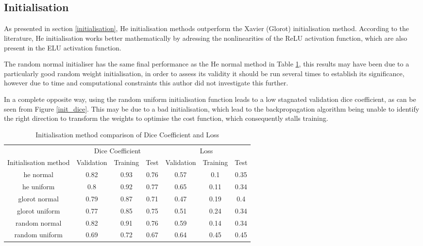 \subsection{Initialisation}
\paragraph{}
As presented in section \ref{initialisation}, He initialisation methods outperform the Xavier (Glorot) initialisation method. According to the literature, He initialisation works better mathematically by adressing the nonlinearities of the \gls{ReLU} activation function, which are also present in the \gls{ELU} activation function. 

The random normal initialiser has the same final performance as the He normal method in Table \ref{tab_init}, this results may have been due to a particularly good random weight initialisation, in order to assess its validity it should be run several times to establish its significance, however due to time and computational constraints this author did not investigate this further.

In a complete opposite way, using the random uniform initialisation function leads to a low stagnated validation dice coefficient, as can be seen from Figure \ref{init_dice}. This may be due to a bad initialisation, which lead to the backpropagation algorithm being unable to identify the right direction to transform the weights to optimise the cost function, which consequently stalls training.

\begin{table}[ht!] 
    \begin{center}
    \begin{tabular}{ccccccc} 
    \toprule
       & \multicolumn{3}{c}{Dice Coefficient}     & \multicolumn{3}{c}{Loss} \\
    Initialisation method & Validation & Training & Test & Validation    & Training    & Test   \\ \midrule
    \rowcolor{lightgray} he normal & 0.82 & 0.93 & 0.76 & 0.57 & 0.1 & 0.35  \\ he uniform & 0.8 & 0.92 & 0.77 & 0.65 & 0.11 & 0.34  \\ glorot normal & 0.79 & 0.87 & 0.71 & 0.47 & 0.19 & 0.4  \\ glorot uniform & 0.77 & 0.85 & 0.75 & 0.51 & 0.24 & 0.34  \\ random normal & 0.82 & 0.91 & 0.76 & 0.59 & 0.14 & 0.34  \\ random uniform & 0.69 & 0.72 & 0.67 & 0.64 & 0.45 & 0.45  \\
    \bottomrule
    \end{tabular}
  \end{center} 
  \caption{Initialisation method comparison of Dice Coefficient and Loss}\label{tab_init}
\end{table}


